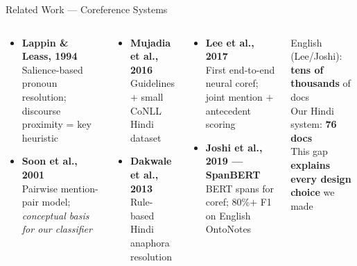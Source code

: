 \documentclass[aspectratio=169]{beamer}
\begin{document}
\begin{frame}{Related Work — Coreference Systems}
  \begin{columns}[T]
      \begin{tcolorbox}[nbox={Classical \& Statistical}]
        \small
        \begin{itemize}\setlength\itemsep{5pt}
          \item \textbf{Lappin \& Leass, 1994}\\
                Salience-based pronoun resolution;
                discourse proximity = key heuristic
          \item \textbf{Soon et al., 2001}\\
                Pairwise mention-pair model;
                \textit{conceptual basis for our classifier}
        \end{itemize}
      \end{tcolorbox}

      \vspace{6pt}
      \begin{tcolorbox}[nbox={Hindi-Specific}]
        \small
        \begin{itemize}\setlength\itemsep{4pt}
          \item \textbf{Mujadia et al., 2016}\\
                Guidelines $+$ small CoNLL Hindi dataset
          \item \textbf{Dakwale et al., 2013}\\
                Rule-based Hindi anaphora resolution
        \end{itemize}
      \end{tcolorbox}

      \begin{tcolorbox}[nbox={Neural Coreference}]
        \small
        \begin{itemize}\setlength\itemsep{5pt}
          \item \textbf{Lee et al., 2017}\\
                First end-to-end neural coref;
                joint mention $+$ antecedent scoring
          \item \textbf{Joshi et al., 2019 — SpanBERT}\\
                BERT spans for coref;
                80\%$+$ F1 on English OntoNotes
        \end{itemize}
      \end{tcolorbox}

      \vspace{6pt}
      \begin{tcolorbox}[wbox={The Resource Gap}]
        \small
        English (Lee/Joshi): \textbf{tens of thousands} of docs\\[3pt]
        Our Hindi system: \textbf{76 docs}\\[3pt]
        This gap \textbf{explains every design choice} we made
      \end{tcolorbox}
  \end{columns}
\end{frame}
\end{document}

